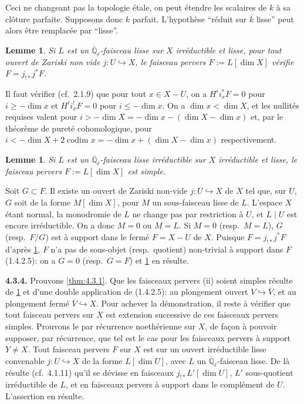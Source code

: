\documentclass[12pt,a4paper]{article}
\theoremstyle{plain}
\newtheorem{lemma}[theorem]{Lemme}
\theoremstyle{definition}
\newcommand{\into}{\hookrightarrow}
\providecommand{\codim}{\operatorname{codim}}
\begin{document}
Ceci ne changeant pas la topologie \'{e}tale, on peut \'{e}tendre les scalaires de $k$ \`{a} sa cl\^{o}ture parfaite. Supposons donc $k$ parfait. L'hypoth\`{e}se ``r\'{e}duit sur $\overline{k}$ lisse'' peut alors \^{e}tre remplac\'{e}e par ``lisse''.

\begin{lemma}\label{lem:4.3.2}
Si $L$ est un $\overline{\mathbb{Q}}_{\ell}$-faisceau lisse sur $X$ irr\'{e}ductible et lisse, pour tout ouvert de Zariski non vide $j: U \into X$, le faisceau pervers $F := L[\dim X]$ v\'{e}rifie $F = j_{!*}j^{*}F$.
\end{lemma}

Il faut v\'{e}rifier (cf.\ 2.1.9) que pour tout $x \in X-U$, on a $H^{i}i_{x}^{*}F = 0$ pour $i \geq -\dim x$ et $H^{i}i_{x}^{!}F = 0$ pour $i \leq -\dim x$. On a $\dim x < \dim X$, et les nullit\'{e}s requises valent pour $i > -\dim X = -\dim x - (\dim X - \dim x)$ et, par le th\'{e}or\`{e}me de puret\'{e} cohomologique, pour $i < -\dim X + 2\codim x = -\dim x + (\dim X - \dim x)$ respectivement.

\begin{lemma}\label{lem:4.3.3}
Si $L$ est un $\overline{\mathbb{Q}}_{\ell}$-faisceau lisse irr\'{e}ductible sur $X$ irr\'{e}ductible et lisse, le faisceau pervers $F := L[\dim X]$ est simple.
\end{lemma}

Soit $G \subset F$. Il existe un ouvert de Zariski non-vide $j: U \into X$ de $X$ tel que, sur $U$, $G$ soit de la forme $M[\dim X]$, pour $M$ un sous-faisceau lisse de $L$. L'espace $X$ \'{e}tant normal, la monodromie de $L$ ne change pas par restriction \`{a} $U$, et $L \mid U$ est encore irr\'{e}ductible. On a donc $M = 0$ ou $M = L$. Si $M = 0$ (resp.\ $M = L$), $G$ (resp.\ $F/G$) est \`{a} support dans le ferm\'{e} $F = X-U$ de $X$. Puisque $F = j_{!*}j^{*}F$ d'apr\`{e}s \ref{lem:4.3.2}, $F$ n'a pas de sous-objet (resp.\ quotient) non-trivial \`{a} support dans $F$ (1.4.2.5): on a $G = 0$ (resp.\ $G = F$) et \ref{lem:4.3.3} en r\'{e}sulte.

\noindent\textbf{4.3.4.} Prouvons \ref{thm:4.3.1}. Que les faisceaux pervers (ii) soient simples r\'{e}sulte de \ref{lem:4.3.3} et d'une double application de (1.4.2.5): au plongement ouvert $V \into \overline{V}$, et au plongement ferm\'{e} $\overline{V} \into X$. Pour achever la d\'{e}monstration, il reste \`{a} v\'{e}rifier que tout faisceau pervers sur $X$ est extension successive de ces faisceaux pervers simples. Prouvons le par r\'{e}currence noeth\'{e}rienne sur $X$, de fa\c{c}on \`{a} pouvoir supposer, par r\'{e}currence, que tel est le cas pour les faisceaux pervers \`{a} support $Y \neq X$. Tout faisceau pervers $F$ sur $X$ est sur un ouvert irr\'{e}ductible lisse convenable $j: U \into X$ de la forme $L[\dim U]$, avec $L$ un $\overline{\mathbb{Q}}_{\ell}$-faisceau lisse. De l\`{a} r\'{e}sulte (cf.\ 4.1.11) qu'il se d\'{e}visse en faisceaux $j_{!*}L'[\dim U]$, $L'$ sous-quotient irr\'{e}ductible de $L$, et en faisceaux pervers \`{a} support dans le compl\'{e}ment de $U$. L'assertion en r\'{e}sulte.
\end{document}

